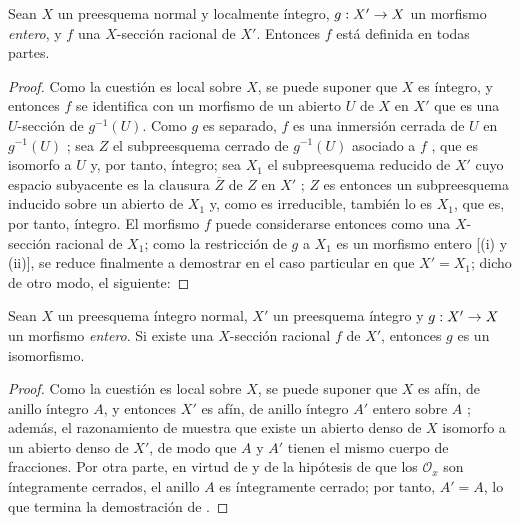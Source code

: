 \documentclass[oneside,10pt]{amsart}
\makeatletter
\newcommand{\ega@arrow}[2]{\mathchoice{#1}{#2}{#2}{#2}}
\renewcommand{\to}{\ega@arrow{\longrightarrow}{\rightarrow}}
\let\EGAOriginalLabel\label
\renewcommand{\label}[1]{\phantomsection\EGAOriginalLabel{#1}}
\makeatother
\begin{document}
\begin{corollary}[6.1.14]
\label{II.6.1.14-fr}
Sean $X$ un preesquema normal y localmente íntegro, $g:X'\to X$ un morfismo \emph{entero}, y $f$ una $X$-sección racional de $X'$.
Entonces $f$ está definida en todas partes.
\end{corollary}

\begin{proof}
Como la cuestión es local sobre $X$, se puede suponer que $X$ es íntegro, y entonces $f$ se identifica con un morfismo de un abierto $U$ de $X$ en $X'$  que es una $U$-sección de $g^{-1}(U)$.
Como $g$ es separado, $f$ es una inmersión cerrada de $U$ en $g^{-1}(U)$ ;
sea $Z$ el subpreesquema cerrado de $g^{-1}(U)$ asociado a $f$ , que es isomorfo a $U$ y, por tanto, íntegro;
sea $X_1$ el subpreesquema reducido de $X'$ cuyo espacio subyacente es la clausura $\overline{Z}$ de $Z$ en $X'$ ;
$Z$ es entonces un subpreesquema inducido sobre un abierto de $X_1$  y, como es irreducible, también lo es $X_1$, que es, por tanto, íntegro.
El morfismo $f$ puede considerarse entonces como una $X$-sección racional de $X_1$;
como la restricción de $g$ a $X_1$ es un morfismo entero [(i) y (ii)], se reduce finalmente a demostrar  en el caso particular en que $X'=X_1$; dicho de otro modo, el siguiente:
\end{proof}

\begin{corollary}[6.1.15]
\label{II.6.1.15-fr}
Sean $X$ un preesquema íntegro normal, $X'$ un preesquema íntegro y $g:X'\to X$ un morfismo \emph{entero}.
Si existe una $X$-sección racional $f$ de $X'$, entonces $g$ es un isomorfismo.
\end{corollary}

\begin{proof}
Como la cuestión es local sobre $X$, se puede suponer que $X$ es afín, de anillo íntegro $A$, y entonces $X'$ es afín, de anillo íntegro $A'$ entero sobre $A$ ;
además, el razonamiento de  muestra que existe un abierto denso de $X$ isomorfo a un abierto denso de $X'$, de modo que $A$ y $A'$ tienen el mismo cuerpo de fracciones.
Por otra parte, en virtud de  y de la hipótesis de que los $\mathcal{O}_x$ son íntegramente cerrados, el anillo $A$ es íntegramente cerrado; por tanto, $A'=A$, lo que termina la demostración de .
\end{proof}
\end{document}

